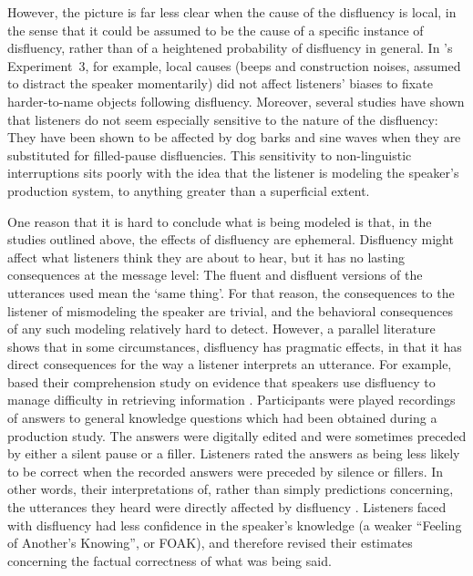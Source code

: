 \documentclass[a4paper,man,natbib]{apa6}
\begin{document}
However, the picture is far less clear when the cause of the disfluency is local, in the sense that it could be assumed to be the cause of a specific instance of disfluency, rather than of a heightened probability of disfluency in general.
In \citeauthor{Arnold2007}'s Experiment~3, for example, local causes (beeps and construction noises, assumed to distract the speaker momentarily) did not affect listeners' biases to fixate harder-to-name objects following disfluency.
Moreover, several studies have shown that listeners do not seem especially sensitive to the nature of the disfluency:  They have been shown to be affected by dog barks \citep{bailey2003disfluencies} and sine waves \citep{corley2011helps} when they are substituted for filled-pause disfluencies.
This sensitivity to non-linguistic interruptions sits poorly with the idea that the listener is modeling the speaker's production system, to anything greater than a superficial extent.

One reason that it is hard to conclude what is being modeled is that, in the studies outlined above, the effects of disfluency are ephemeral.
Disfluency might affect what listeners think they are about to hear, but it has no lasting consequences at the message level:
The fluent and disfluent versions of the utterances used mean the `same thing'.
For that reason, the consequences to the listener of mismodeling the speaker are trivial, and the behavioral consequences of any such modeling relatively hard to detect.
However, a parallel literature shows that in some circumstances, disfluency has pragmatic effects, in that it has direct consequences for the way a listener interprets an utterance.
%
For example, \citet{Brennan1995} based their comprehension study on evidence that speakers use disfluency to manage difficulty in retrieving information \citep{Smith1993}.
Participants were played recordings of answers to general knowledge questions which had been obtained during a production study.
The answers were digitally edited and were sometimes preceded by either a silent pause or a filler.
Listeners rated the answers as being less likely to be correct when the recorded answers were preceded by silence or fillers.
In other words, their interpretations of, rather than simply predictions concerning, the utterances they heard were directly affected by disfluency \citep[see also][]{Swerts2005}.
Listeners faced with disfluency had less confidence in the speaker's knowledge (a weaker ``Feeling of Another's Knowing'', or FOAK), and therefore revised their estimates concerning the factual correctness of what was being said.
\end{document}
